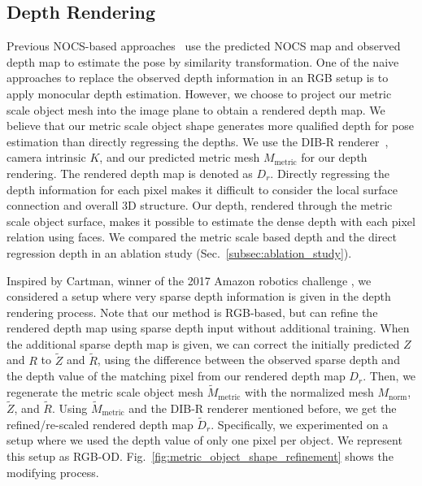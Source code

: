 \documentclass[letterpaper, 10 pt, journal, twoside]{IEEEtran}
\newcommand{\figref}[1]{Fig.~\ref{#1}}
\newcommand{\secref}[1]{Sec.~\ref{#1}}
\begin{document}
\subsection{Depth Rendering}
\label{subsec:depth_rendering}
Previous NOCS-based approaches~\cite{wang2019normalized, Tian2020prior} use the predicted NOCS map and observed depth map to estimate the pose by similarity transformation.
One of the naive approaches to replace the observed depth information in an RGB setup is to apply monocular depth estimation.
However, we choose to project our metric scale object mesh into the image plane to obtain a rendered depth map.
We believe that our metric scale object shape generates more qualified depth for pose estimation than directly regressing the depths.
We use the DIB-R renderer~\cite{chen2019learning, wang2020self6d}, camera intrinsic $K$, and our predicted metric mesh $M_{\text{metric}}$ for our depth rendering.
The rendered depth map is denoted as $D_r$.
Directly regressing the depth information for each pixel makes it difficult to consider the local surface connection and overall 3D structure.
Our depth, rendered through the metric scale object surface, makes it possible to estimate the dense depth with each pixel relation using faces.
We compared the metric scale based depth and the direct regression depth in an ablation study (\secref{subsec:ablation_study}).

Inspired by Cartman, winner of the 2017 Amazon robotics challenge \cite{morrison2018cartman}, we considered a setup where very sparse depth information is given in the depth rendering process.
Note that our method is RGB-based, but can refine the rendered depth map using sparse depth input without additional training.
When the additional sparse depth map is given, we can correct the initially predicted $Z$ and $R$ to $\tilde{Z}$ and $\tilde{R}$, using the difference between the observed sparse depth and the depth value of the matching pixel from our rendered depth map $D_r$.
Then, we regenerate the metric scale object mesh $\tilde{M}_{\text{metric}}$ with the normalized mesh $M_{\text{norm}}$, $\tilde{Z}$, and $\tilde{R}$.
Using $\tilde{M}_{\text{metric}}$ and the DIB-R renderer mentioned before, we get the refined/re-scaled rendered depth map $\tilde{D}_r$.
Specifically, we experimented on a setup where we used the depth value of only one pixel per object. We represent this setup as RGB-OD.
\figref{fig:metric_object_shape_refinement} shows the modifying process.
\end{document}
